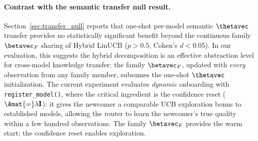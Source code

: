 \paragraph{Contrast with the semantic transfer null result.}
Section~\ref{sec:transfer_null} reports that one-shot per-model
semantic $\thetavec$ transfer provides no statistically significant
benefit beyond the continuous family $\betavec_F$ sharing of Hybrid LinUCB
($p{>}0.5$, Cohen's $d{<}0.05$).  In our evaluation, this suggests the hybrid
decomposition is an effective abstraction level for cross-model knowledge
transfer: the family $\betavec_F$, updated with \emph{every} observation
from any family member, subsumes the one-shot $\thetavec$ initialization.
The current experiment evaluates \emph{dynamic} onboarding with
\texttt{register\_model()}, where the critical ingredient is the
confidence reset ($\Amat{=}\lambda\mathbf{I}$): it gives the newcomer a
comparable UCB exploration bonus to established models, allowing the
router to learn the newcomer's true quality within a few hundred
observations.  The family $\betavec_F$ provides the warm start; the
confidence reset enables exploration.
